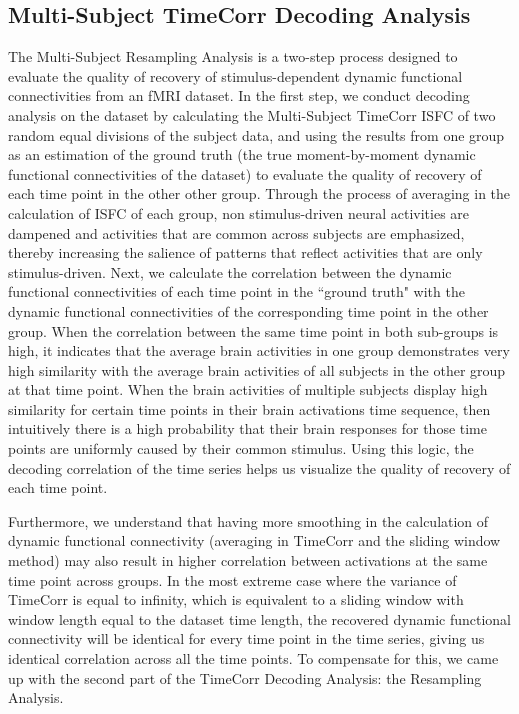\documentclass[11pt]{article}
\begin{document}
\subsection{Multi-Subject TimeCorr Decoding Analysis}
The Multi-Subject Resampling Analysis is a two-step process designed to evaluate the quality of recovery of stimulus-dependent dynamic functional connectivities from an fMRI dataset. In the first step, we conduct decoding analysis on the dataset by calculating the Multi-Subject TimeCorr ISFC of two random equal divisions of the subject data, and using the results from one group as an estimation of the ground truth (the true moment-by-moment dynamic functional connectivities of the dataset) to evaluate the quality of recovery of each time point in the other other group. Through the process of averaging in the calculation of ISFC of each group, non stimulus-driven neural activities are dampened and activities that are common across subjects are emphasized, thereby increasing the salience of patterns that reflect activities that are only stimulus-driven. Next, we calculate the correlation between the dynamic functional connectivities of each time point in the ``ground truth" with the dynamic functional connectivities of the corresponding time point in the other group. When the correlation between the same time point in both sub-groups is high, it indicates that the average brain activities in one group demonstrates very high similarity with the average brain activities of all subjects in the other group at that time point. When the brain activities of multiple subjects display high similarity for certain time points in their brain activations time sequence, then intuitively there is a high probability that their brain responses for those time points are uniformly caused by their common stimulus. Using this logic, the decoding correlation of the time series helps us visualize the quality of recovery of each time point.

Furthermore, we understand that having more smoothing in the calculation of dynamic functional connectivity (averaging in TimeCorr and the sliding window method) may also result in higher correlation between activations at the same time point across groups. In the most extreme case where the variance of TimeCorr is equal to infinity, which is equivalent to a sliding window with window length equal to the dataset time length, the recovered dynamic functional connectivity will be identical for every time point in the time series, giving us identical correlation across all the time points. To compensate for this, we came up with the second part of the TimeCorr Decoding Analysis: the Resampling Analysis.
\end{document}
